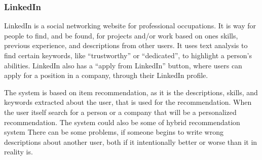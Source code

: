 \subsubsection{LinkedIn}

LinkedIn is a social networking website for professional occupations. It is way for people to find, and be found, for projects and/or work based on ones skills, previous experience, and descriptions from other users. It uses text analysis to find certain keywords, like “trustworthy” or “dedicated”, to highlight a person's abilities. LinkedIn also has a “apply from LinkedIn” button, where users can apply for a position in a company, through their LinkedIn profile. 

The system is based on item recommendation, as it is the descriptions, skills, and keywords extracted about the user, that is used for the recommendation. When the user itself search for a person or a company that will be a personalized recommendation. The system could also be some of hybrid recommendation system There can be some problems, if someone begins to write wrong descriptions about another user, both if it intentionally better or worse than it in reality is.